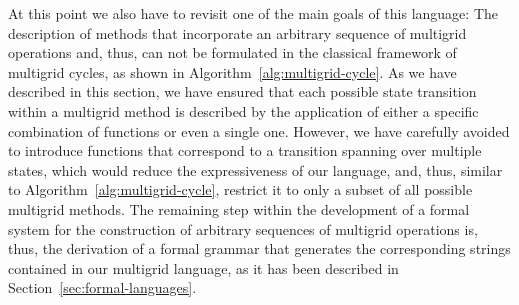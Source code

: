 At this point we also have to revisit one of the main goals of this language: The description of methods that incorporate an arbitrary sequence of multigrid operations and, thus, can not be formulated in the classical framework of multigrid cycles, as shown in Algorithm~\ref{alg:multigrid-cycle}.
As we have described in this section, we have ensured that each possible state transition within a multigrid method is described by the application of either a specific combination of functions or even a single one.
However, we have carefully avoided to introduce functions that correspond to a transition spanning over multiple states, which would reduce the expressiveness of our language, and, thus, similar to Algorithm~\ref{alg:multigrid-cycle}, restrict it to only a subset of all possible multigrid methods.
The remaining step within the development of a formal system for the construction of arbitrary sequences of multigrid operations is, thus, the derivation of a formal grammar that generates the corresponding strings contained in our multigrid language, as it has been described in Section~\ref{sec:formal-languages}.
